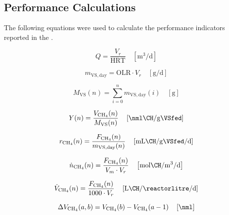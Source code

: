 \documentclass[12pt, a4paper, oneside]{report}
\begin{document}
\subsection{Performance Calculations}
\label{subsec:performance_calculations}

The following equations were used to calculate the performance indicators reported in the .

\begin{equation}
    Q = \frac{V_r}{\mathrm{HRT}} \quad \left[\unit{\cubic\metre\per\day}\right]
    \label{eq:Q}
\end{equation}

\begin{equation}
    m_{\mathrm{VS,day}} = \mathrm{OLR} \cdot V_r \quad \left[\unit{\gram\per\day}\right]
    \label{eq:mVS_day}
\end{equation}

\begin{equation}
    M_{\mathrm{VS}}(n) = \sum_{i=0}^{n} m_{\mathrm{VS,day}}(i) \quad \left[\unit{\gram}\right]
    \label{eq:cumVS}
\end{equation}

\begin{equation}
    Y(n) = \frac{V_{\mathrm{CH_4}}(n)}{M_{\mathrm{VS}}(n)} \quad \left[\unit{\nml\CH\per\gram\VSfed}\right]
    \label{eq:cumYield}
\end{equation}

\begin{equation}
    r_{\mathrm{CH_4}}(n) = \frac{F_{\mathrm{CH_4}}(n)}{m_{\mathrm{VS,day}}(n)} \quad \left[\unit{\milli\litre\CH\per\gram\VSfed\per\day}\right]
    \label{eq:dailyRate}
\end{equation}

\begin{equation}
    \dot{n}_{\mathrm{CH_4}}(n) = \frac{F_{\mathrm{CH_4}}(n)}{V_m \cdot V_r} \quad \left[\unit{\mol\CH\per\cubic\metre\per\day}\right]
    \label{eq:molRate}
\end{equation}

\begin{equation}
    \dot{V}_{\mathrm{CH_4}}(n) = \frac{F_{\mathrm{CH_4}}(n)}{1000 \cdot V_r} \quad \left[\unit{\litre\CH\per\reactorlitre\per\day}\right]
    \label{eq:volRate}
\end{equation}

\begin{equation}
    \Delta V_{\mathrm{CH_4}}(a,b) = V_{\mathrm{CH_4}}(b) - V_{\mathrm{CH_4}}(a-1) \quad \left[\unit{\nml}\right]
    \label{eq:deltaVCH4}
\end{equation}
\end{document}
